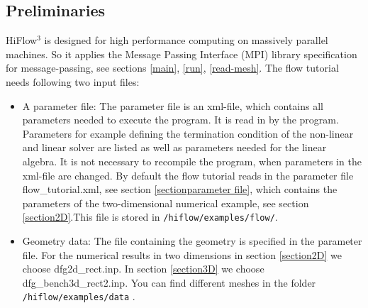 \documentclass[a4paper, 11pt, twoside]{article}
\begin{document}
\subsection{Preliminaries}
HiFlow$^3$ is designed for high performance computing on massively parallel machines. 
So it applies the Message Passing Interface (MPI) library specification for message-passing, see sections \ref{main}, \ref{run}, \ref{read-mesh}. 
The flow tutorial needs following two input files:
\begin{itemize}
\item A parameter file: The parameter file is an xml-file, which contains all parameters needed to execute the program. It is read in by the program. Parameters for example defining the termination condition of the non-linear and linear solver are listed as well as parameters needed for the linear algebra. It is not necessary to recompile the program, when parameters in the xml-file are changed. By default the flow tutorial reads in the parameter file flow\_tutorial.xml, see section \ref{sectionparameter file}, which contains the parameters of the two-dimensional numerical example, see section \ref{section2D}.This file is stored in \verb'/hiflow/examples/flow/'. 
\item Geometry data: The file containing the geometry is specified in the parameter file. For the numerical results in two dimensions in section \ref{section2D} we choose dfg2d\_rect.inp. In section \ref{section3D} we choose dfg\_bench3d\_rect2.inp. You can find different meshes in the folder \newline \verb'/hiflow/examples/data' .
\end{itemize}
\end{document}
